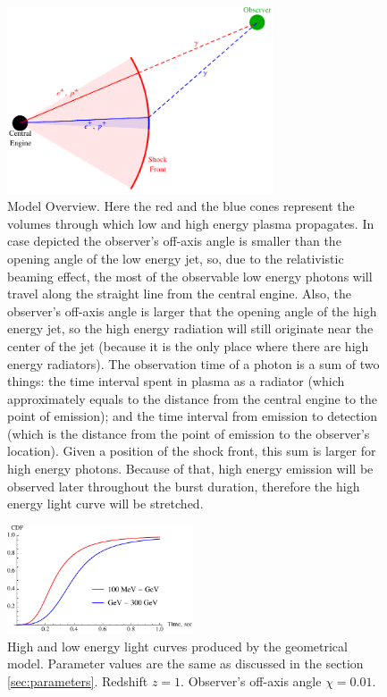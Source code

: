 \documentclass{article}
\begin{document}
\begin{figure}
        \centering
        \includegraphics[width=0.7\textwidth]{modelOverview}
        \caption{
        	Model Overview. Here the red and the blue cones represent the volumes through which low and high energy plasma propagates. In case depicted the observer's off-axis angle is smaller than the opening angle of the low energy jet, so, due to the relativistic beaming effect, the most of the observable low energy photons will travel along the straight line from the central engine. Also, the observer's off-axis angle is larger that the opening angle of the high energy jet, so the high energy radiation will still originate near the center of the jet (because it is the only place where there are high energy radiators). The observation time of a photon is a sum of two things: the time interval spent in plasma as a radiator (which approximately equals to the distance from the central engine to the point of emission); and the time interval from emission to detection (which is the distance from the point of emission to the observer's location). Given a position of the shock front, this sum is larger for high energy photons. Because of that, high energy emission will be observed later throughout the burst duration, therefore the high energy light curve will be stretched.
        }
        \label{fig:modelOverview}
\end{figure}

\begin{figure}
	\centering
	\includegraphics[width=0.49\textwidth]{sampleLightCurve}
	\caption{
		High and low energy light curves produced by the geometrical model. Parameter values are the same as discussed in the section \ref{sec:parameters}. Redshift $z = 1$. Observer's off-axis angle $\chi = 0.01$.
	}
	\label{fig:sampleLightCurve}
\end{figure}
\end{document}
